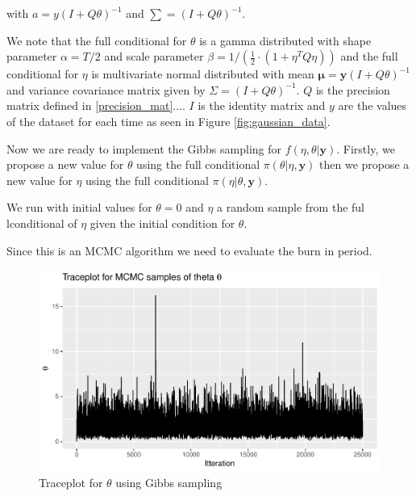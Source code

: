 with $a = y(I + Q \theta)^{-1}$ and $\sum = (I + Q \theta)^{-1}$. 

We note that the full conditional for $\theta$ is a gamma distributed with shape parameter $\alpha = T/2$ and scale parameter $\beta = 1/(\frac{1}{2}\cdot (1 + \eta^T Q \eta))$ and the full conditional for $\eta$ is multivariate normal distributed with mean $\boldsymbol{\mu} = \boldsymbol{y}(I + Q \theta)^{-1}$ and variance covariance matrix given by $\Sigma = (I + Q \theta)^{-1}$. $Q$ is the precision matrix defined in  \ref{precision_mat}....
$I$ is the identity matrix and $y$ are the values of the dataset for each time as seen in Figure \ref{fig:gaussian_data}. 




Now we are ready to implement the Gibbs sampling for $f(\eta, \theta | \boldsymbol{y})$. Firstly, we propose a new value for $\theta$ using the full conditional $\pi(\theta|\eta, \boldsymbol{y})$ then we propose a new value for $\eta$ using the full conditional $\pi(\eta|\theta, \boldsymbol{y})$. 



We run with initial values for $\theta = 0$ and $\eta$ a random sample from the ful lconditional of $\eta$ given the initial condition for $\theta$.



Since this is an MCMC algorithm we need to evaluate the burn in period. 

\begin{figure}
    \centering
    \includegraphics[width = \textwidth]{Images/trace_theta_mcmc.pdf}
    \caption{Traceplot for $\theta$ using Gibbs sampling}
    \label{fig:trace_theta}
\end{figure}

